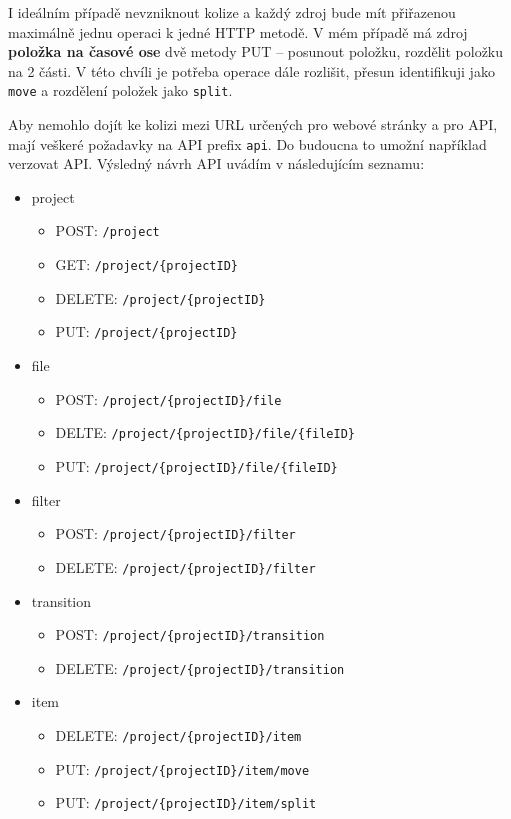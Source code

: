 I ideálním případě nevzniknout kolize a každý zdroj bude mít přiřazenou maximálně jednu operaci k jedné HTTP metodě. V mém případě má zdroj \textbf{položka na časové ose} dvě metody PUT -- posunout položku, rozdělit položku na 2 části. V této chvíli je potřeba operace dále rozlišit, přesun identifikuji jako \texttt{move} a rozdělení položek jako \texttt{split}.

Aby nemohlo dojít ke kolizi mezi URL určených pro webové stránky a pro API, mají veškeré požadavky na API prefix \texttt{api}. Do budoucna to umožní například verzovat API. Výsledný návrh API uvádím v následujícím seznamu:
\begin{itemize}
\item project
\begin{itemize}
\item POST: \texttt{/project}
\item GET: \texttt{/project/\{projectID\}}
\item DELETE: \texttt{/project/\{projectID\}}
\item PUT: \texttt{/project/\{projectID\}}
\end{itemize}
\item file
\begin{itemize}
\item POST: \texttt{/project/\{projectID\}/file}
\item DELTE: \texttt{/project/\{projectID\}/file/\{fileID\}}
\item PUT: \texttt{/project/\{projectID\}/file/\{fileID\}}
\end{itemize}
\item filter
\begin{itemize}
\item POST: \texttt{/project/\{projectID\}/filter}
\item DELETE: \texttt{/project/\{projectID\}/filter}
\end{itemize}
\item transition
\begin{itemize}
\item POST: \texttt{/project/\{projectID\}/transition}
\item DELETE: \texttt{/project/\{projectID\}/transition}
\end{itemize}
\item item
\begin{itemize}
\item DELETE: \texttt{/project/\{projectID\}/item}
\item PUT: \texttt{/project/\{projectID\}/item/move}
\item PUT: \texttt{/project/\{projectID\}/item/split}
\end{itemize}
\end{itemize}

